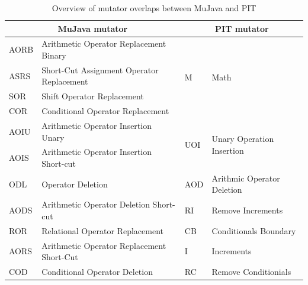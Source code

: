 \documentclass[conference,draftclsnofoot,onecolumn]{IEEEtran}
\begin{document}
\begin{table}[ht]
\centering
\begin{tabular}{|l|l|l|l|}
\hline
\multicolumn{2}{|c|}{\textbf{ MuJava mutator}}      & \multicolumn{2}{c|}{\textbf{PIT mutator}}                         \\ \hline
AORB & Arithmetic Operator Replacement Binary      & \multirow{4}{*}{M}   & \multirow{4}{*}{Math}                      \\ \cline{1-2}
ASRS & Short-Cut Assignment   Operator Replacement &                      &                                            \\ \cline{1-2}
SOR  & Shift Operator   Replacement                &                      &                                            \\ \cline{1-2}
COR  & Conditional Operator   Replacement          &                      &                                            \\ \hline
AOIU & Arithmetic Operator   Insertion Unary       & \multirow{2}{*}{UOI} & \multirow{2}{*}{Unary Operation Insertion} \\ \cline{1-2}
AOIS & Arithmetic Operator   Insertion Short-cut   &                      &                                            \\ \hline
ODL  & Operator Deletion                           & AOD                  & Arithmic Operator   Deletion               \\ \hline
AODS & Arithmetic Operator   Deletion Short-cut    & RI                   & Remove Increments                          \\ \hline
ROR  & Relational Operator   Replacement           & CB                   & Conditionals Boundary                      \\ \hline
AORS & Arithmetic Operator   Replacement Short-Cut & I                    & Increments                                 \\ \hline
COD  & Conditional Operator   Deletion             & RC                   & Remove Conditionials                       \\ \hline

\end{tabular}
\caption{\label{tab:mutators-overlap}Overview of mutator overlaps between  MuJava and PIT}
\end{table}
\end{document}
